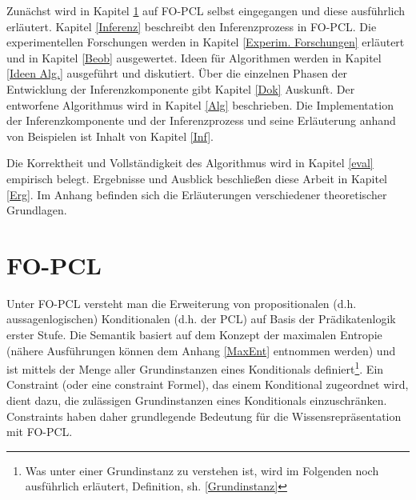 \documentclass[a4paper, 11pt]{book}
\begin{document}
Zunächst wird in Kapitel \ref{FO-PCL} auf FO-PCL selbst eingegangen und diese ausführlich erläutert. Kapitel \ref{Inferenz} beschreibt den Inferenzprozess in FO-PCL. Die experimentellen Forschungen werden in Kapitel \ref{Experim. Forschungen} erläutert und in Kapitel \ref{Beob} ausgewertet. Ideen für Algorithmen werden in Kapitel \ref{Ideen Alg.} ausgeführt und diskutiert. Über die einzelnen Phasen der Entwicklung der Inferenzkomponente gibt Kapitel  \ref{Dok} Auskunft. Der entworfene Algorithmus wird in Kapitel \ref{Alg}  beschrieben. Die Implementation der Inferenzkomponente und der Inferenzprozess  und seine Erläuterung anhand von Beispielen ist Inhalt von Kapitel \ref{Inf}. 

 Die Korrektheit und Vollständigkeit des Algorithmus wird in Kapitel \ref{eval} empirisch belegt. Ergebnisse und Ausblick beschließen diese Arbeit in Kapitel \ref{Erg}. Im Anhang befinden sich die Erläuterungen verschiedener theoretischer Grundlagen.



\newpage

\chapter{FO-PCL}\label{FO-PCL} 
Unter FO-PCL versteht man die Erweiterung von propositionalen (d.h. aussagenlogischen) Konditionalen (d.h. der PCL) auf Basis der Prädikatenlogik erster Stufe. Die Semantik basiert auf dem Konzept der maximalen Entropie (nähere Ausführungen können dem Anhang \ref{MaxEnt} entnommen werden) und ist mittels der Menge aller Grundinstanzen eines Konditionals definiert\footnote{Was unter einer Grundinstanz zu verstehen ist, wird im Folgenden noch ausführlich erläutert, Definition, sh. \ref{Grundinstanz} }. Ein Constraint  (oder eine constraint Formel), das einem Konditional  zugeordnet wird, dient dazu,  die zulässigen Grundinstanzen eines Konditionals einzuschränken. Constraints haben daher grundlegende Bedeutung für die Wissensrepräsentation mit FO-PCL.
\end{document}
